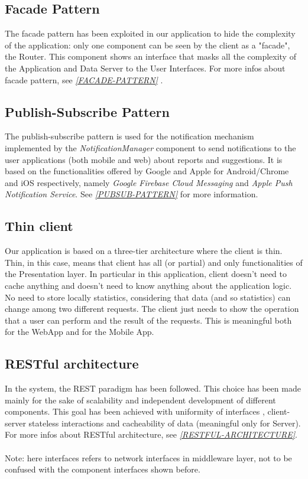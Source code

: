 \documentclass[a4paper]{report}
\begin{document}
\subsection{Facade Pattern}
The facade pattern has been exploited in our application to hide the complexity of the application: only one component can be seen by the client as a "facade", the Router. This component shows an interface that masks all the complexity of the Application and Data Server to the User Interfaces. For more infos about facade pattern, see \hyperref[ref:facade-pattern]{\textit{[FACADE-PATTERN]}} \label{use:facade-pattern}.
\subsection{Publish-Subscribe Pattern}
The publish-subscribe pattern is used for the notification mechanism implemented by the \textit{NotificationManager} component to send notifications to the user applications (both mobile and web) about reports and suggestions. It is based on the functionalities offered by Google and Apple for Android/Chrome and iOS respectively, namely \textit{Google Firebase Cloud Messaging} and \textit{Apple Push Notification Service}. \label{use:pubsub-pattern} See \hyperref[ref:pubsub-pattern]{\textit{[PUBSUB-PATTERN]}} for more information.
\subsection{Thin client}
Our application is based on a three-tier architecture where the client is thin. Thin, in this case, means that client has all (or partial) and only functionalities of the Presentation layer. In particular in this application, client doesn't need to cache anything and doesn't need to know anything about the application logic. No need to store locally statistics, considering that data (and so statistics) can change among two different requests. The client just needs to show the operation that a user can perform and the result of the requests. This is meaningful both for the WebApp and for the Mobile App. 
\subsection{RESTful architecture}
In the system, the REST paradigm has been followed. This choice has been made mainly for the sake of scalability and independent development of different components. This goal has been achieved with uniformity of interfaces , client-server stateless interactions and cacheability of data (meaningful only for Server). For more infos about RESTful architecture, see \hyperref[ref:RESTful-architecture]{\textit{[RESTFUL-ARCHITECTURE]}}. \label{use:RESTful-architecture} \\
\\
Note: here interfaces refers to network interfaces in middleware layer, not to be confused with the component interfaces shown before.
\end{document}

